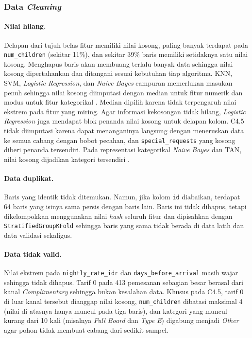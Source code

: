 \subsubsection{Data \textit{Cleaning}}

\paragraph{Nilai hilang.} Delapan dari tujuh belas fitur memiliki nilai kosong,
paling banyak terdapat pada \texttt{num\_children} (sekitar 11\%), dan sekitar 39\% baris
memiliki setidaknya satu nilai kosong. Menghapus baris akan membuang terlalu
banyak data sehingga nilai kosong dipertahankan dan ditangani sesuai kebutuhan
tiap algoritma. KNN, SVM, \textit{Logistic Regression}, dan \textit{Naive
Bayes} campuran memerlukan masukan penuh sehingga nilai kosong diimputasi
dengan median untuk fitur numerik dan modus untuk fitur kategorikal
\cite{ref:materi-09}. Median dipilih karena tidak terpengaruh nilai ekstrem
pada fitur yang miring. Agar informasi kekosongan tidak hilang,
\textit{Logistic Regression} juga mendapat blok penanda nilai kosong untuk
delapan kolom. C4.5 tidak diimputasi karena dapat menanganinya langsung
dengan meneruskan data ke semua cabang dengan bobot pecahan, dan
\texttt{special\_requests} yang kosong diberi penanda tersendiri. Pada
representasi kategorikal \textit{Naive Bayes} dan TAN, nilai kosong dijadikan
kategori tersendiri \cite{ref:materi-09}.

\paragraph{Data duplikat.} Baris yang identik tidak ditemukan.
Namun, jika kolom \texttt{id} diabaikan, terdapat 64 baris yang isinya sama
persis dengan baris lain. Baris ini tidak dihapus, tetapi dikelompokkan
menggunakan nilai \textit{hash} seluruh fitur dan dipisahkan dengan
\texttt{Stratified\allowbreak GroupKFold} sehingga baris yang sama tidak berada
di data latih dan data validasi sekaligus.

\paragraph{Data tidak valid.} Nilai ekstrem pada \texttt{nightly\_rate\_idr} dan
\texttt{days\_before\_arrival} masih wajar sehingga tidak dihapus. Tarif $0$ pada
413 pemesanan sebagian besar berasal dari kanal \textit{Complimentary} sehingga
bukan kesalahan data. Khusus pada C4.5, tarif $0$ di luar kanal tersebut dianggap
nilai kosong, \texttt{num\_children} dibatasi maksimal 4 (nilai di atasnya hanya
muncul pada tiga baris), dan kategori yang muncul kurang dari 10 kali
(misalnya \textit{Full Board} dan \textit{Type E}) digabung menjadi
\textit{Other} agar pohon tidak membuat cabang dari sedikit sampel.

